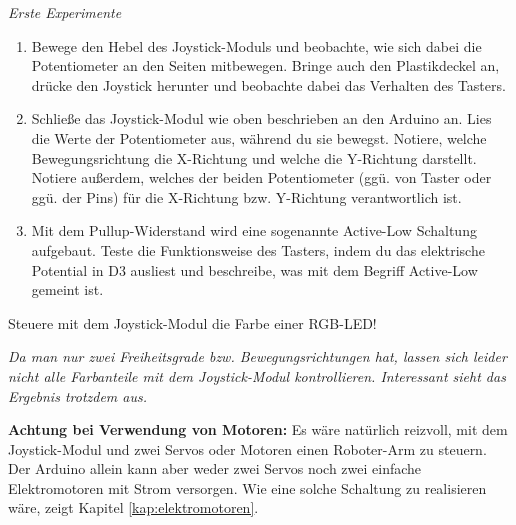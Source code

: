 \begin{aufgabe} \emph{Erste Experimente}
	\begin{enumerate}[label=\alph*), itemsep=0ex,parsep=0ex]
		\item Bewege den Hebel des Joystick-Moduls und beobachte, wie sich dabei die Potentiometer an den Seiten mitbewegen. Bringe auch den Plastikdeckel an, drücke den Joystick herunter und beobachte dabei das Verhalten des Tasters.
		\item Schließe das Joystick-Modul wie oben beschrieben an den Arduino an. Lies die Werte der Potentiometer aus, während du sie bewegst. Notiere, welche Bewegungsrichtung die X-Richtung und welche die Y-Richtung darstellt. Notiere außerdem, welches der beiden Potentiometer (ggü. von Taster oder ggü. der Pins) für die X-Richtung bzw. Y-Richtung verantwortlich ist.
		\item Mit dem Pullup-Widerstand wird eine sogenannte Active-Low Schaltung aufgebaut. Teste die Funktionsweise des Tasters, indem du das elektrische Potential in D3 ausliest und beschreibe, was mit dem Begriff Active-Low gemeint ist.
	\end{enumerate}
\end{aufgabe}

\begin{projekt}\label{proj:joystick-rgb}
	Steuere mit dem Joystick-Modul die Farbe einer RGB-LED!
	
	\emph{\footnotesize Da man nur zwei Freiheitsgrade bzw. Bewegungsrichtungen hat, lassen sich leider nicht alle Farbanteile mit dem Joystick-Modul kontrollieren. Interessant sieht das Ergebnis trotzdem aus.}
\end{projekt}


\textbf{Achtung bei Verwendung von Motoren:}\marginpar{\centering\ausrufezeichen} Es wäre natürlich reizvoll, mit dem Joystick-Modul und zwei Servos oder Motoren einen Roboter-Arm zu steuern. Der Arduino allein kann aber weder zwei Servos noch zwei einfache Elektromotoren mit Strom versorgen. Wie eine solche Schaltung zu realisieren wäre, zeigt Kapitel \ref{kap:elektromotoren}.

